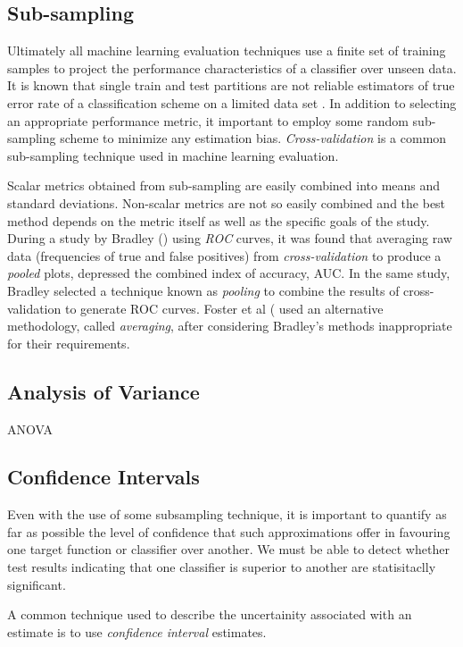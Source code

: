 \documentclass[10pt]{unbthesis}
\begin{document}
\subsection*{Sub-sampling}
Ultimately all machine learning evaluation techniques use a finite set
of training samples to project the performance characteristics of a
classifier over unseen data. It is known that single train and test
partitions are not reliable estimators of true error rate of a
classification scheme on a limited data set \cite{RefWorks:57}. In
addition to selecting an appropriate performance metric, it important
to employ some random sub-sampling scheme to minimize any estimation
bias. \textit{Cross-validation} is a common sub-sampling technique
used in machine learning evaluation.

Scalar metrics obtained from sub-sampling are easily combined into
means and standard deviations. Non-scalar metrics are not so easily
combined and the best method depends on the metric itself as well as
the specific goals of the study. During a
study by Bradley (\cite{RefWorks:32}) using \textit{ROC} curves, it was found
that averaging raw data (frequencies of true and false positives) from
\textit{cross-validation} to produce a \textit{pooled} plots,
depressed the combined index of accuracy, AUC. In the same study,
Bradley selected a technique known as \textit{pooling} to combine the
results of cross-validation to generate ROC curves. Foster et al
(\cite{RefWorks:45} used an alternative methodology, called
\textit{averaging}, after considering Bradley's methods inappropriate
for their requirements.

\subsection*{Analysis of Variance}
ANOVA

\subsection*{Confidence Intervals}
Even with the use of some subsampling technique, it is important to
quantify as far as possible the level of confidence that such
approximations offer in favouring one target function or classifier
over another.  We must be able to detect whether test results
indicating that one classifier is superior to another are
statisitaclly significant. 

A common technique used to describe the uncertainity associated with
an estimate is to use \textit{confidence interval} estimates.
\end{document}
